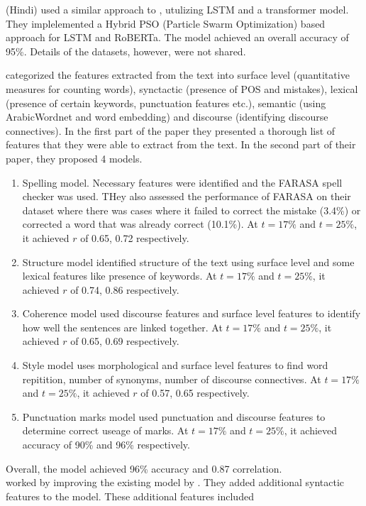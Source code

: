 \documentclass{article}
\begin{document}
\textbf{\textcite{11_walia2024hybrid}} (Hindi) used a similar approach to \textcite{10_singh2023hindi}, utulizing LSTM and a transformer model. They implelemented a Hybrid PSO (Particle Swarm Optimization) based approach for LSTM and RoBERTa. The model achieved an overall accuracy of 95\%. Details of the datasets, however, were not shared.

\textbf{\textcite{18_alqahtani2020svr}} categorized the features extracted from the text into surface level (quantitative measures for counting words), synctactic (presence of POS and mistakes), lexical (presence of certain keywords, punctuation features etc.), semantic (using ArabicWordnet and word embedding) and discourse (identifying discourse connectives). In the first part of the paper they presented a thorough list of features that they were able to extract from the text. In the second part of their paper, they proposed 4 models.
\begin{enumerate}
	\item Spelling model. Necessary features were identified and the FARASA spell checker was used. THey also assessed the performance of FARASA on their dataset where there was cases where it failed to correct the mistake (3.4\%) or corrected a word that was already correct (10.1\%). At $t = 17\%$ and $t = 25\%$, it achieved $r$ of 0.65, 0.72 respectively.
	\item Structure model identified structure of the text using surface level and some lexical features like presence of keywords. At $t = 17\%$ and $t = 25\%$, it achieved $r$ of 0.74, 0.86 respectively.
	\item Coherence model used discourse features and surface level features to identify how well the sentences are linked together. At $t = 17\%$ and $t = 25\%$, it achieved $r$ of 0.65, 0.69 respectively.
	\item Style model uses morphological and surface level features to find word repitition, number of synonyms, number of discourse connectives. At $t = 17\%$ and $t = 25\%$, it achieved $r$ of 0.57, 0.65 respectively.
	\item Punctuation marks model used punctuation and discourse features to determine correct useage of marks. At $t = 17\%$ and $t = 25\%$, it achieved accuracy of 90\% and 96\% respectively. 
\end{enumerate}
Overall, the model achieved 96\% accuracy and 0.87 correlation. \\
\textbf{\textcite{26_alsanie2022threelevels}} worked by improving the existing model by \textcite{6_ghamdi2014hybridarabic}. They added additional syntactic features to the model. These additional features included 
\end{document}
